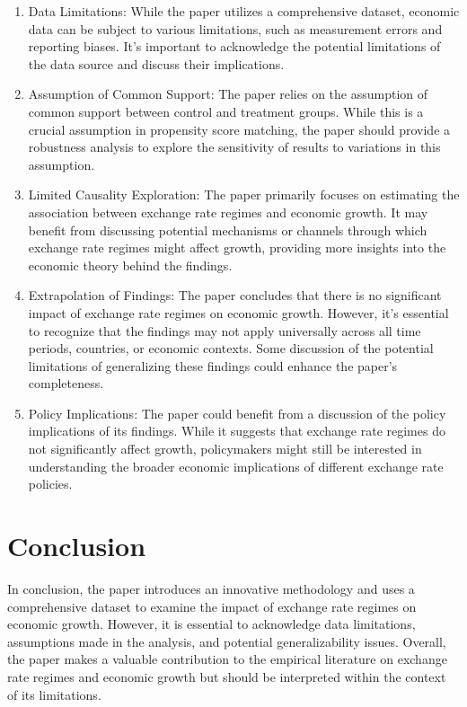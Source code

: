 \documentclass[
  12pt]{article}
\begin{document}
\begin{enumerate}
\def\labelenumi{\arabic{enumi}.}
\item
  Data Limitations: While the paper utilizes a comprehensive dataset,
  economic data can be subject to various limitations, such as
  measurement errors and reporting biases. It's important to acknowledge
  the potential limitations of the data source and discuss their
  implications.
\item
  Assumption of Common Support: The paper relies on the assumption of
  common support between control and treatment groups. While this is a
  crucial assumption in propensity score matching, the paper should
  provide a robustness analysis to explore the sensitivity of results to
  variations in this assumption.
\item
  Limited Causality Exploration: The paper primarily focuses on
  estimating the association between exchange rate regimes and economic
  growth. It may benefit from discussing potential mechanisms or
  channels through which exchange rate regimes might affect growth,
  providing more insights into the economic theory behind the findings.
\item
  Extrapolation of Findings: The paper concludes that there is no
  significant impact of exchange rate regimes on economic growth.
  However, it's essential to recognize that the findings may not apply
  universally across all time periods, countries, or economic contexts.
  Some discussion of the potential limitations of generalizing these
  findings could enhance the paper's completeness.
\item
  Policy Implications: The paper could benefit from a discussion of the
  policy implications of its findings. While it suggests that exchange
  rate regimes do not significantly affect growth, policymakers might
  still be interested in understanding the broader economic implications
  of different exchange rate policies.
\end{enumerate}

\hypertarget{conclusion}{%
\section{Conclusion}\label{conclusion}}

In conclusion, the paper introduces an innovative methodology and uses a
comprehensive dataset to examine the impact of exchange rate regimes on
economic growth. However, it is essential to acknowledge data
limitations, assumptions made in the analysis, and potential
generalizability issues. Overall, the paper makes a valuable
contribution to the empirical literature on exchange rate regimes and
economic growth but should be interpreted within the context of its
limitations.
\end{document}
